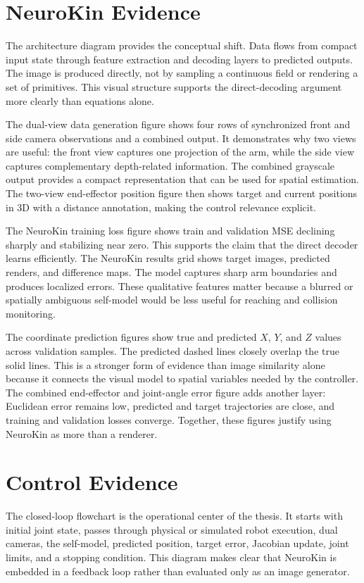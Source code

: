\documentclass[12pt,a4paper,oneside]{report}
\begin{document}
\section{NeuroKin Evidence}

The architecture diagram provides the conceptual shift. Data flows from compact input state through feature extraction and decoding layers to predicted outputs. The image is produced directly, not by sampling a continuous field or rendering a set of primitives. This visual structure supports the direct-decoding argument more clearly than equations alone.

The dual-view data generation figure shows four rows of synchronized front and side camera observations and a combined output. It demonstrates why two views are useful: the front view captures one projection of the arm, while the side view captures complementary depth-related information. The combined grayscale output provides a compact representation that can be used for spatial estimation. The two-view end-effector position figure then shows target and current positions in 3D with a distance annotation, making the control relevance explicit.

The NeuroKin training loss figure shows train and validation MSE declining sharply and stabilizing near zero. This supports the claim that the direct decoder learns efficiently. The NeuroKin results grid shows target images, predicted renders, and difference maps. The model captures sharp arm boundaries and produces localized errors. These qualitative features matter because a blurred or spatially ambiguous self-model would be less useful for reaching and collision monitoring.

The coordinate prediction figures show true and predicted $X$, $Y$, and $Z$ values across validation samples. The predicted dashed lines closely overlap the true solid lines. This is a stronger form of evidence than image similarity alone because it connects the visual model to spatial variables needed by the controller. The combined end-effector and joint-angle error figure adds another layer: Euclidean error remains low, predicted and target trajectories are close, and training and validation losses converge. Together, these figures justify using NeuroKin as more than a renderer.

\section{Control Evidence}

The closed-loop flowchart is the operational center of the thesis. It starts with initial joint state, passes through physical or simulated robot execution, dual cameras, the self-model, predicted position, target error, Jacobian update, joint limits, and a stopping condition. This diagram makes clear that NeuroKin is embedded in a feedback loop rather than evaluated only as an image generator.
\end{document}
